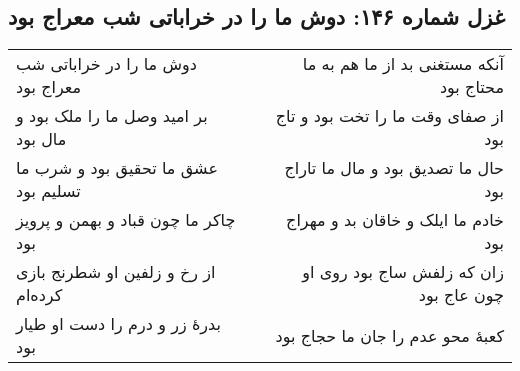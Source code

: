 \begin{center}
\section*{غزل شماره ۱۴۶: دوش ما را در خراباتی شب معراج بود}
\label{sec:146}
\begin{longtable}{l p{0.5cm} r}
دوش ما را در خراباتی شب معراج بود
&&
آنکه مستغنی بد از ما هم به ما محتاج بود
\\
بر امید وصل ما را ملک بود و مال بود
&&
از صفای وقت ما را تخت بود و تاج بود
\\
عشق ما تحقیق بود و شرب ما تسلیم بود
&&
حال ما تصدیق بود و مال ما تاراج بود
\\
چاکر ما چون قباد و بهمن و پرویز بود
&&
خادم ما ایلک و خاقان بد و مهراج بود
\\
از رخ و زلفین او شطرنج بازی کرده‌ام
&&
زان که زلفش ساج بود روی او چون عاج بود
\\
بدرهٔ زر و درم را دست او طیار بود
&&
کعبهٔ محو عدم را جان ما حجاج بود
\\
\end{longtable}
\end{center}
